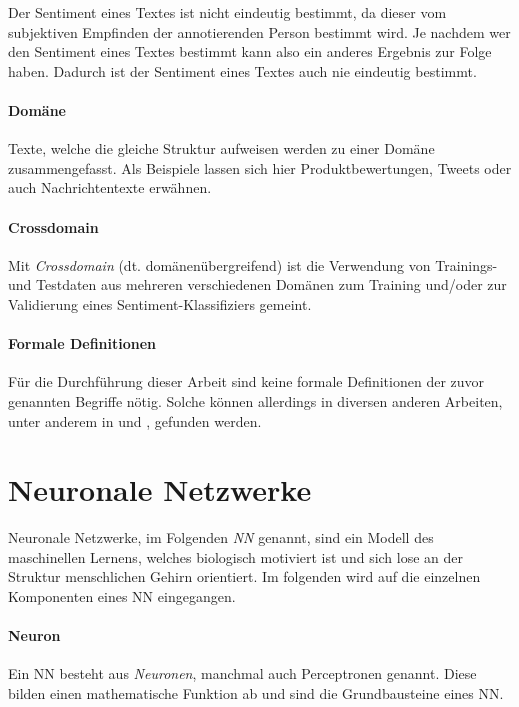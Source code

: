 Der Sentiment eines Textes ist nicht eindeutig bestimmt, da dieser vom subjektiven Empfinden der annotierenden Person bestimmt wird. Je nachdem wer den Sentiment eines Textes bestimmt kann also ein anderes Ergebnis zur Folge haben. Dadurch ist der Sentiment eines Textes auch nie eindeutig bestimmt.

\paragraph{Domäne} Texte, welche die gleiche Struktur aufweisen werden zu einer Domäne zusammengefasst. Als Beispiele lassen sich hier Produktbewertungen, Tweets oder auch Nachrichtentexte erwähnen.

\paragraph{Crossdomain} 
Mit \emph{Crossdomain} (dt. domänenübergreifend) ist die Verwendung von Trainings- und Testdaten aus mehreren verschiedenen Domänen zum Training und/oder zur Validierung eines Sentiment-Klassifiziers gemeint.

\paragraph{Formale Definitionen}
Für die Durchführung dieser Arbeit sind keine formale Definitionen der zuvor genannten Begriffe nötig. Solche können allerdings in diversen anderen Arbeiten, unter anderem in \cite{Pan:2010} und \cite{Bollegala:2016}, gefunden werden.

\section{Neuronale Netzwerke}
\label{basics:neural_network}

Neuronale Netzwerke, im Folgenden \emph{\gls{NN}} genannt, sind ein Modell des maschinellen Lernens, welches biologisch motiviert ist und sich lose an der Struktur menschlichen Gehirn orientiert. Im folgenden wird auf die einzelnen Komponenten eines NN eingegangen.

\paragraph{Neuron}\label{basic:neural_network:neuron} Ein NN besteht aus \emph{Neuronen}, manchmal auch Perceptronen genannt. Diese bilden einen mathematische Funktion ab und sind die Grundbausteine eines NN.

